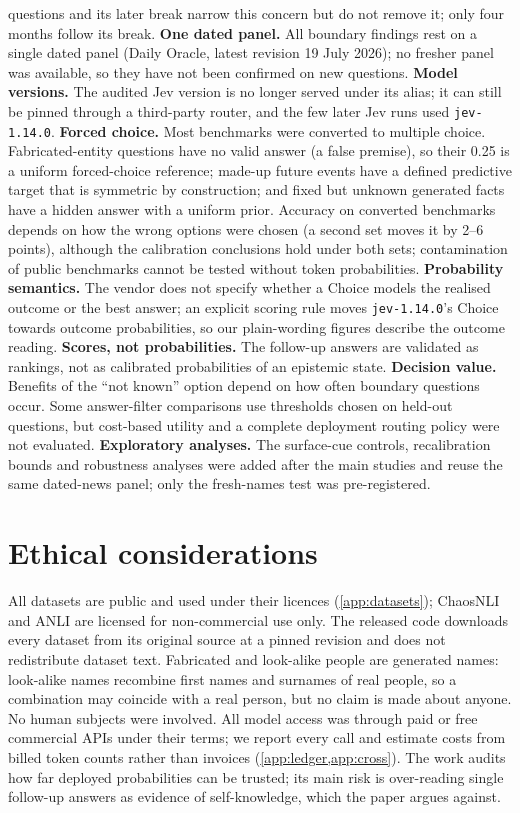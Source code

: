 \documentclass[10pt,twocolumn]{article}
\begin{document}
questions and its later break narrow this concern but do not remove it; only
four months follow its break. \textbf{One dated panel.} All boundary
findings rest on a single dated panel (Daily Oracle, latest revision 19 July
2026); no fresher panel was available, so they have not been confirmed on new
questions. \textbf{Model versions.} The audited Jev version is no longer
served under its alias; it can still be pinned through a third-party router,
and the few later Jev runs used \texttt{jev-1.14.0}. \textbf{Forced choice.} Most benchmarks
were converted to multiple choice. Fabricated-entity questions have no valid
answer (a false premise), so their 0.25 is a uniform forced-choice reference;
made-up future events have a defined predictive target that is symmetric by
construction; and fixed but unknown generated facts have a hidden answer with
a uniform prior. Accuracy on converted benchmarks depends on how the wrong
options were chosen (a second set moves it by 2--6 points), although the
calibration conclusions hold under both sets; contamination of public
benchmarks cannot be tested without token probabilities. \textbf{Probability
semantics.} The vendor does not specify whether a Choice models the realised
outcome or the best answer; an explicit scoring rule moves
\texttt{jev-1.14.0}'s Choice towards outcome probabilities, so our
plain-wording figures describe the outcome reading.
\textbf{Scores, not probabilities.} The follow-up answers are validated as
rankings, not as calibrated probabilities of an epistemic state.
\textbf{Decision value.} Benefits of the ``not known'' option depend on how
often boundary questions occur. Some answer-filter comparisons use thresholds
chosen on held-out questions, but cost-based utility and a complete deployment
routing policy were not evaluated. \textbf{Exploratory analyses.} The surface-cue
controls, recalibration bounds and robustness analyses were added after the
main studies and reuse the same dated-news panel; only the fresh-names test
was pre-registered.

\section*{Ethical considerations}
All datasets are public and used under their licences (\cref{app:datasets});
ChaosNLI and ANLI are licensed for non-commercial use only. The released
code downloads every dataset from its original source at a pinned revision
and does not redistribute dataset text.
Fabricated and look-alike people are generated names: look-alike names
recombine first names and surnames of real people, so a combination may
coincide with a real person, but no claim is made about anyone. No human
subjects were involved. All model access was through paid or free commercial
APIs under their terms; we report every call and estimate costs from billed
token counts rather than invoices (\cref{app:ledger,app:cross}). The work
audits how far deployed probabilities can be trusted; its main risk is
over-reading single follow-up answers as evidence of self-knowledge, which
the paper argues against.
\end{document}
